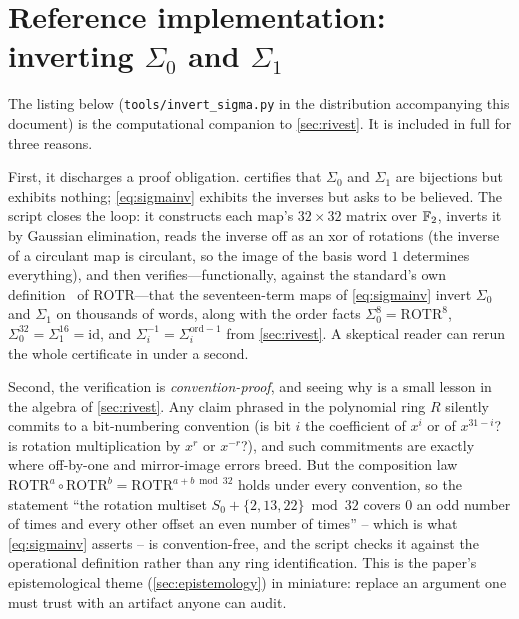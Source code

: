 \section{Reference implementation: inverting $\Sigma_0$ and $\Sigma_1$}
\label{app:sigmacode}

The listing below (\texttt{tools/invert\_sigma.py} in the distribution
accompanying this document) is the computational companion to
\cref{sec:rivest}. It is included in full for three reasons.

First, it discharges a proof obligation.  certifies
that $\Sigma_0$ and $\Sigma_1$ are bijections but exhibits nothing;
\cref{eq:sigmainv} exhibits the inverses but asks to be believed. The
script closes the loop: it constructs each map's $32\times32$ matrix
over $\mathbb{F}_2$, inverts it by Gaussian elimination, reads the inverse off
as an xor of rotations (the inverse of a circulant map is circulant, so
the image of the basis word $1$ determines everything), and then
verifies---functionally, against the standard's own
definition~\citep{FIPS180-4} of $\mathrm{ROTR}$---that the seventeen-term
maps of \cref{eq:sigmainv} invert $\Sigma_0$ and $\Sigma_1$ on thousands
of words, along with the order facts $\Sigma_0^{8} = \mathrm{ROTR}^{8}$,
$\Sigma_0^{32} = \Sigma_1^{16} = \mathrm{id}$, and
$\Sigma_i^{-1} = \Sigma_i^{\mathrm{ord}-1}$ from \cref{sec:rivest}.
A skeptical reader can rerun the whole certificate in under a second.

Second, the verification is \emph{convention-proof}, and seeing why is a
small lesson in the algebra of \cref{sec:rivest}. Any claim phrased in
the polynomial ring $R$ silently commits to a bit-numbering convention
(is bit $i$ the coefficient of $x^i$ or of $x^{31-i}$? is rotation
multiplication by $x^r$ or $x^{-r}$?), and such commitments are exactly
where off-by-one and mirror-image errors breed. But the composition law
$\mathrm{ROTR}^{a} \circ \mathrm{ROTR}^{b} = \mathrm{ROTR}^{a+b \bmod 32}$
holds under every convention, so the statement ``the rotation multiset
$S_0 + \{2,13,22\} \bmod 32$ covers $0$ an odd number of times and every
other offset an even number of times'' -- which is what
\cref{eq:sigmainv} asserts -- is convention-free, and the script checks
it against the operational definition rather than any ring
identification. This is the paper's epistemological theme
(\cref{sec:epistemology}) in miniature: replace an argument one must
trust with an artifact anyone can audit.

